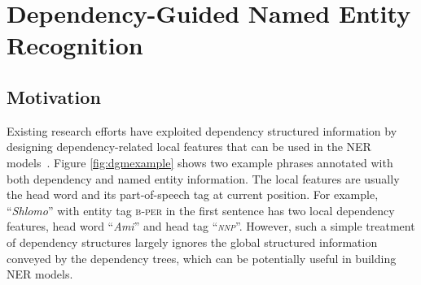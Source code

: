
\chapter{Dependency-Guided Named Entity Recognition} %

\label{Chapter3} %


\section{Motivation}

Existing research efforts have exploited dependency structured information by designing dependency-related local features  that can be used in the NER models~\cite{sasano2008japanese,ling2012fine,cucchiarelli2001unsupervised}. 
Figure \ref{fig:dgmexample} shows two example phrases annotated with both dependency and named entity information. 
The local features are usually the head word and its part-of-speech tag at current position. 
For example, ``{\em Shlomo}'' with entity tag \textsc{b-per} in the first sentence has two local dependency features, head word ``{\em Ami}'' and  head tag ``{\em \textsc{nnp}}''. 
However, such a simple treatment of dependency structures largely ignores the global structured information conveyed by the dependency trees, which can be potentially useful in building NER models.

